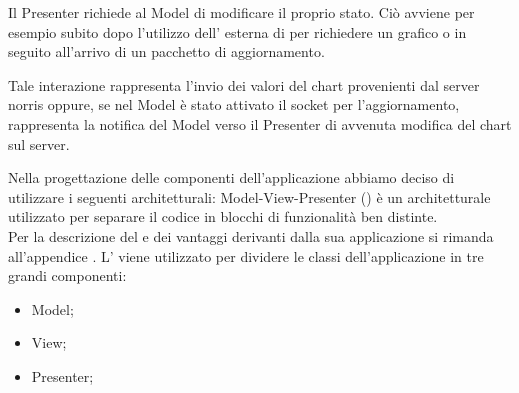         Il Presenter richiede al Model di modificare il proprio stato. Ciò avviene per esempio subito dopo l'utilizzo dell' esterna di  per richiedere un grafico o in seguito all'arrivo di un pacchetto di aggiornamento.

        Tale interazione rappresenta l'invio dei valori del chart provenienti dal server norris oppure, se nel Model è stato attivato il socket per l'aggiornamento, rappresenta la notifica del Model verso il Presenter di avvenuta modifica del chart sul server.

        
    Nella progettazione delle componenti dell'applicazione  abbiamo deciso di utilizzare i seguenti  architetturali:
        Model-View-Presenter () è un  architetturale utilizzato per separare il codice in blocchi di funzionalità ben distinte.\\
        Per la descrizione del  e dei vantaggi derivanti dalla sua applicazione si rimanda all'appendice .
        L' viene utilizzato per dividere le classi dell'applicazione  in tre grandi componenti:
        \begin{itemize}
        \item Model;
        \item View;
        \item Presenter;
        \end{itemize}

